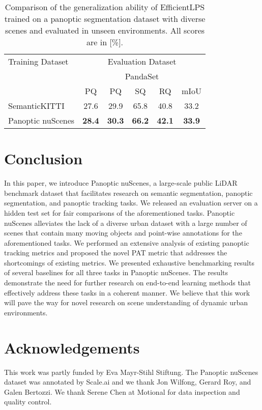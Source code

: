 \documentclass[letterpaper, 10 pt, journal, twoside]{IEEEtran}
\begin{document}
\begin{table}
\centering
\caption{Comparison of the generalization ability of EfficientLPS trained on a panoptic segmentation dataset with diverse scenes and evaluated in unseen environments. All scores are in [\%].}
\label{tab:generalization}
\footnotesize
\begin{tabular}{l|ccccc}
\toprule
Training Dataset & \multicolumn{5}{c}{Evaluation Dataset} \\
\cmidrule{2-6}
&  \multicolumn{5}{c}{PandaSet} \\
\cmidrule{2-6}
& PQ & PQ & SQ & RQ & mIoU  \\ 
\toprule
SemanticKITTI & 27.6 & 29.9 & 65.8 & 40.8 & 33.2\\
Panoptic nuScenes & \textbf{28.4} & \textbf{30.3} & \textbf{66.2} & \textbf{42.1} & \textbf{33.9}\\
\bottomrule
\end{tabular}
\vspace{-0.3cm}
\end{table} 
\section{Conclusion}

In this paper, we introduce Panoptic nuScenes, a large-scale public LiDAR benchmark dataset that facilitates research on semantic segmentation, panoptic segmentation, and panoptic tracking tasks. We released an evaluation server on a hidden test set for fair comparisons of the aforementioned tasks. Panoptic nuScenes alleviates the lack of a diverse urban dataset with a large number of scenes that contain many moving objects and point-wise annotations for the aforementioned tasks. We performed an extensive analysis of existing panoptic tracking metrics and proposed the novel PAT metric that addresses the shortcomings of existing metrics. We presented exhaustive benchmarking results of several baselines for all three tasks in Panoptic nuScenes. The results demonstrate the need for further research on end-to-end learning methods that effectively address these tasks in a coherent manner. We believe that this work will pave the way for novel research on scene understanding of dynamic urban environments. 
\section*{Acknowledgements}

This work was partly funded by Eva Mayr-Stihl Stiftung. The Panoptic nuScenes dataset was annotated by Scale.ai and we thank Jon Wilfong, Gerard Roy, and Galen Bertozzi. We thank Serene Chen at Motional for data inspection and quality control.
\end{document}
